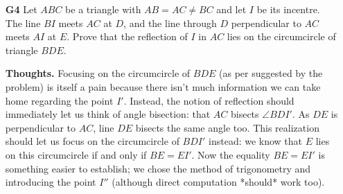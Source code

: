 \documentclass[11pt,a4paper]{article}
\begin{document}
\begin{itemize}
\newpage

\item[\textbf{G4}]
Let $ABC$ be a triangle with $AB = AC \neq BC$ and let $I$ be its incentre. The line $BI$ meets $AC$ at $D$, and the line through $D$ perpendicular to $AC$ meets $AI$ at $E$. Prove that the reflection of $I$ in $AC$ lies on the circumcircle of triangle $BDE$.

\textbf{Thoughts.} Focusing on the circumcircle of $BDE$ (as per suggested by the problem) is itself a pain because there isn't much information we can take home regarding the point $I'$. Instead, the notion of reflection should immediately let us think of angle bisection: that $AC$ bisects $\angle BDI'$. As $DE$ is perpendicular to $AC$, line $DE$ bisects the same angle too. This realization should let us focus on the circumcircle of $BDI'$ instead: we know that $E$ lies on this circumcircle if and only if $BE=EI'$. Now the equality $BE=EI'$ is something easier to establish; we chose the method of trigonometry and introducing the point $I''$ (although direct computation *should* work too). 


\end{itemize}
\end{document}
